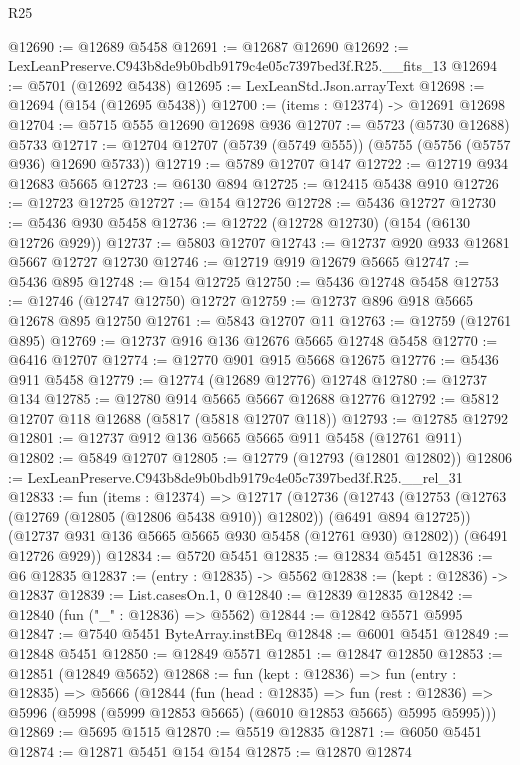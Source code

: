 \begin{lexlean}{R25}
\begin{coremodule}
@12690 := @12689 @5458
@12691 := @12687 @12690
@12692 := LexLeanPreserve.C943b8de9b0bdb9179c4e05c7397bed3f.R25.__fits_13
@12694 := @5701 (@12692 @5438)
@12695 := LexLeanStd.Json.arrayText
@12698 := @12694 (@154 (@12695 @5438))
@12700 := (items : @12374) -> @12691 @12698
@12704 := @5715 @555 @12690 @12698 @936
@12707 := @5723 (@5730 @12688) @5733
@12717 := @12704 @12707 (@5739 (@5749 @555)) (@5755 (@5756 (@5757 @936) @12690 @5733))
@12719 := @5789 @12707 @147
@12722 := @12719 @934 @12683 @5665
@12723 := @6130 @894
@12725 := @12415 @5438 @910
@12726 := @12723 @12725
@12727 := @154 @12726
@12728 := @5436 @12727
@12730 := @5436 @930 @5458
@12736 := @12722 (@12728 @12730) (@154 (@6130 @12726 @929))
@12737 := @5803 @12707
@12743 := @12737 @920 @933 @12681 @5667 @12727 @12730
@12746 := @12719 @919 @12679 @5665
@12747 := @5436 @895
@12748 := @154 @12725
@12750 := @5436 @12748 @5458
@12753 := @12746 (@12747 @12750) @12727
@12759 := @12737 @896 @918 @5665 @12678 @895 @12750
@12761 := @5843 @12707 @11
@12763 := @12759 (@12761 @895)
@12769 := @12737 @916 @136 @12676 @5665 @12748 @5458
@12770 := @6416 @12707
@12774 := @12770 @901 @915 @5668 @12675
@12776 := @5436 @911 @5458
@12779 := @12774 (@12689 @12776) @12748
@12780 := @12737 @134
@12785 := @12780 @914 @5665 @5667 @12688 @12776
@12792 := @5812 @12707 @118 @12688 (@5817 (@5818 @12707 @118))
@12793 := @12785 @12792
@12801 := @12737 @912 @136 @5665 @5665 @911 @5458 (@12761 @911)
@12802 := @5849 @12707
@12805 := @12779 (@12793 (@12801 @12802))
@12806 := LexLeanPreserve.C943b8de9b0bdb9179c4e05c7397bed3f.R25.__rel_31
@12833 := fun (items : @12374) =>
  @12717
    (@12736
      (@12743
        (@12753 (@12763 (@12769 (@12805 (@12806 @5438 @910)) @12802)) (@6491 @894 @12725))
        (@12737 @931 @136 @5665 @5665 @930 @5458 (@12761 @930) @12802))
      (@6491 @12726 @929))
@12834 := @5720 @5451
@12835 := @12834 @5451
@12836 := @6 @12835
@12837 := (entry : @12835) -> @5562
@12838 := (kept : @12836) -> @12837
@12839 := List.casesOn.{1, 0}
@12840 := @12839 @12835
@12842 := @12840 (fun ("_" : @12836) => @5562)
@12844 := @12842 @5571 @5995
@12847 := @7540 @5451 ByteArray.instBEq
@12848 := @6001 @5451
@12849 := @12848 @5451
@12850 := @12849 @5571
@12851 := @12847 @12850
@12853 := @12851 (@12849 @5652)
@12868 := fun (kept : @12836) =>
  fun (entry : @12835) =>
  @5666
    (@12844
      (fun (head : @12835) =>
      fun (rest : @12836) => @5996 (@5998 (@5999 @12853 @5665) (@6010 @12853 @5665) @5995 @5995)))
@12869 := @5695 @1515
@12870 := @5519 @12835
@12871 := @6050 @5451
@12874 := @12871 @5451 @154 @154
@12875 := @12870 @12874

\end{coremodule}
\end{lexlean}
